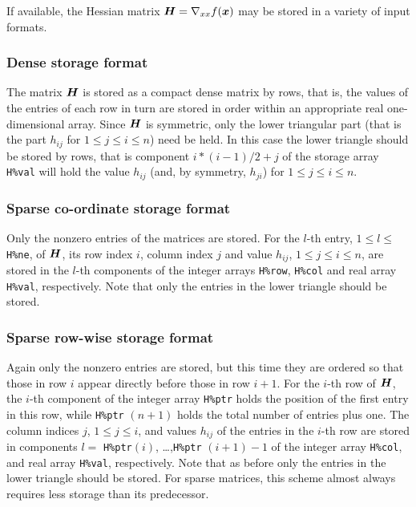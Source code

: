 \documentclass{galahad}
\begin{document}

\galmatrix
If available, the Hessian matrix ${\bm{H}} = \nabla_{xx} f({\bm{x}})$
may be stored in a variety of input formats.

\subsubsection{Dense storage format}\label{dense}
The matrix ${\bm{H}}$ is stored as a compact
dense matrix by rows, that is, the values of the entries of each row in turn are
stored in order within an appropriate real one-dimensional array.
Since ${\bm{H}}$ is symmetric, only the lower triangular part (that is the part
$h_{ij}$ for $1 \leq j \leq i \leq n$) need be held. In this case
the lower triangle should be stored by rows, that is
component $i \ast (i-1)/2 + j$ of the storage array {\tt H\%val}
will hold the value $h_{ij}$ (and, by symmetry, $h_{ji}$)
for $1 \leq j \leq i \leq n$.

\subsubsection{Sparse co-ordinate storage format}\label{coordinate}
Only the nonzero entries of the matrices are stored.
For the $l$-th entry, $1 \leq l \leq$ {\tt H\%ne}, of ${\bm{H}}$, 
its row index $i$, column index $j$ and value $h_{ij}$,
$1 \leq j \leq i \leq n$,
are stored in the $l$-th components of the integer arrays {\tt H\%row},
{\tt H\%col} and real array {\tt H\%val}, respectively.
Note that only the entries in the lower triangle should be stored.

\subsubsection{Sparse row-wise storage format}\label{rowwise}
Again only the nonzero entries are stored, but this time
they are ordered so that those in row $i$ appear directly before those
in row $i+1$. For the $i$-th row of ${\bm{H}}$, the $i$-th component of the
integer array {\tt H\%ptr} holds the position of the first entry in this row,
while {\tt H\%ptr} $(n+1)$ holds the total number of entries plus one.
The column indices $j$, $1 \leq j \leq i$, and values $h_{ij}$ of the
entries in the $i$-th row are stored in components
$l =$ {\tt H\%ptr}$(i)$, \ldots ,{\tt H\%ptr} $(i+1)-1$ of the
integer array {\tt H\%col}, and real array {\tt H\%val}, respectively.
Note that as before only the entries in the lower triangle should be stored.
For sparse matrices, this scheme almost always requires less storage than
its predecessor.
\end{document}
